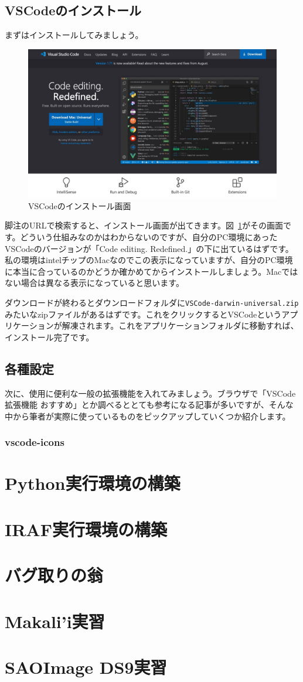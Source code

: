 \subsection{VSCodeのインストール}
まずはインストールしてみましょう。
\begin{figure}[h]
	\centering
	\includegraphics[width=0.7\linewidth]{./fig/appendix/vscode_install.png}
	\caption{VSCodeのインストール画面}
	\label{fig:vscode_install}
\end{figure}
脚注のURLで検索すると、インストール画面が出てきます。図~\ref{fig:vscode_install}がその画面です。どういう仕組みなのかはわからないのですが、自分のPC環境にあったVSCodeのバージョンが「Code editing. Redefined.」の下に出ているはずです。私の環境はintelチップのMacなのでこの表示になっていますが、自分のPC環境に本当に合っているのかどうか確かめてからインストールしましょう。Macではない場合は異なる表示になっていると思います。\par
ダウンロードが終わるとダウンロードフォルダに\texttt{VSCode-darwin-universal.zip}みたいなzipファイルがあるはずです。これをクリックするとVSCodeというアプリケーションが解凍されます。これをアプリケーションフォルダに移動すれば、インストール完了です。

\subsection{各種設定}
次に、使用に便利な一般の拡張機能を入れてみましょう。ブラウザで「VSCode 拡張機能 おすすめ」とか調べるととても参考になる記事が多いですが、そんな中から筆者が実際に使っているものをピックアップしていくつか紹介します。

\subsubsection{vscode-icons}

\section{Python実行環境の構築}

\section{IRAF実行環境の構築}

\section{バグ取りの翁}

\section{Makali'i実習}

\section{SAOImage DS9実習}